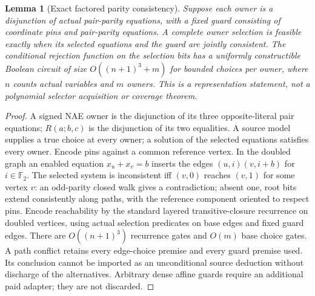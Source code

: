 \documentclass[11pt]{article}
\newtheorem{lemma}[theorem]{Lemma}
\begin{document}
\begin{lemma}[Exact factored parity consistency]\label{lem:gd23-graph}
Suppose each owner is a disjunction of actual pair-parity equations, with a fixed guard consisting of coordinate pins and pair-parity equations. A complete owner selection is feasible exactly when its selected equations and the guard are jointly consistent. The conditional rejection function on the selection bits has a uniformly constructible Boolean circuit of size $O((n+1)^3+m)$ for bounded choices per owner, where $n$ counts actual variables and $m$ owners. This is a representation statement, not a polynomial selector acquisition or coverage theorem.
\end{lemma}
\begin{proof}
A signed NAE owner is the disjunction of its three opposite-literal pair equations; $R(a;b,c)$ is the disjunction of its two equalities. A source model supplies a true choice at every owner; a solution of the selected equations satisfies every owner. Encode pins against a common reference vertex. In the doubled graph an enabled equation $x_u+x_v=b$ inserts the edges $(u,i)(v,i+b)$ for $i\in\mathbb F_2$. The selected system is inconsistent iff $(v,0)$ reaches $(v,1)$ for some vertex $v$: an odd-parity closed walk gives a contradiction; absent one, root bits extend consistently along paths, with the reference component oriented to respect pins. Encode reachability by the standard layered transitive-closure recurrence on doubled vertices, using actual selection predicates on base edges and fixed guard edges. There are $O((n+1)^3)$ recurrence gates and $O(m)$ base choice gates. A path conflict retains every edge-choice premise and every guard premise used. Its conclusion cannot be imported as an unconditional source deduction without discharge of the alternatives. Arbitrary dense affine guards require an additional paid adapter; they are not discarded.
\end{proof}
\end{document}
